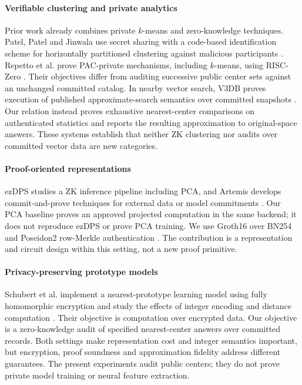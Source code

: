 \paragraph{Verifiable clustering and private analytics}
Prior work already combines private $k$-means and zero-knowledge techniques. Patel, Patel and Jinwala use secret sharing with a code-based identification scheme for horizontally partitioned clustering against malicious participants \cite{patel2013clustering}. Repetto et al. prove PAC-private mechanisms, including $k$-means, using RISC-Zero \cite{repetto2026pac}. Their objectives differ from auditing successive public center sets against an unchanged committed catalog. In nearby vector search, V3DB proves execution of published approximate-search semantics over committed snapshots \cite{v3db2026}. Our relation instead proves exhaustive nearest-center comparisons on authenticated statistics and reports the resulting approximation to original-space answers. These systems establish that neither ZK clustering nor audits over committed vector data are new categories.

\paragraph{Proof-oriented representations}
ezDPS studies a ZK inference pipeline including PCA, and Artemis develops commit-and-prove techniques for external data or model commitments \cite{ezdps2023,artemis2024}. Our PCA baseline proves an approved projected computation in the same backend; it does not reproduce ezDPS or prove PCA training. We use Groth16 over BN254 and Poseidon2 row-Merkle authentication \cite{groth2016,poseidon22023}. The contribution is a representation and circuit design within this setting, not a new proof primitive.

\paragraph{Privacy-preserving prototype models}
Schubert et al. implement a nearest-prototype learning model using fully homomorphic encryption and study the effects of integer encoding and distance computation \cite{schubert2026prototype}. Their objective is computation over encrypted data. Our objective is a zero-knowledge audit of specified nearest-center answers over committed records. Both settings make representation cost and integer semantics important, but encryption, proof soundness and approximation fidelity address different guarantees. The present experiments audit public centers; they do not prove private model training or neural feature extraction.

